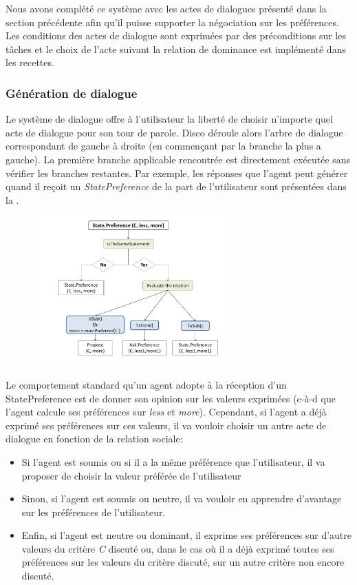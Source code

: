 \documentclass [french]{sig-alternate-05-2015}
\begin{document}
Nous avons complété ce système avec les actes de dialogues présenté dans la section précédente afin qu'il puisse supporter la négociation sur les préférences. Les conditions des actes de dialogue sont exprimées par des préconditions sur les tâches et le choix de l'acte suivant la relation de dominance est implémenté dans les recettes.

\subsubsection{Génération de dialogue} 
 \par Le système de dialogue offre à l'utilisateur la liberté de choisir n'importe quel acte de dialogue pour son tour de parole. Disco déroule alors l'arbre de dialogue correspondant de gauche à droite (en commençant par la branche la plus a gauche). La première branche applicable rencontrée est directement exécutée sans vérifier les branches restantes.
 Par exemple, les réponses que l'agent peut générer quand il reçoit un \emph{StatePreference} de la part de l'utilisateur sont présentées dans la .

 \begin{figure} [h]
 	\centerline{\includegraphics[width=3in]{figs/statePref.pdf}}
	\vskip 8pt
 \end{figure}

Le comportement standard qu'un agent adopte à la réception d'un StatePreference est de donner son opinion sur les valeurs exprimées (c-à-d que l'agent calcule ses préférences sur \textit{less} et \textit{more}). Cependant, si l'agent a déjà exprimé ses préférences sur ces valeurs, il va vouloir choisir un autre acte de dialogue en fonction de la relation sociale:
 \begin{itemize}
 	\item Si l'agent est soumis ou si il a la même préférence que l'utilisateur, il va proposer de choisir la valeur préférée de l'utilisateur
 	\item Sinon, si l'agent est soumis ou neutre, il va vouloir en apprendre d'avantage sur  les préférences de l'utilisateur.
 	\item Enfin, si l'agent est neutre ou dominant, il exprime ses préférences sur d'autre valeurs du critère \emph{C} discuté ou, dans le cas où il a déjà exprimé toutes ses préférences sur les valeurs du critère discuté, sur un autre critère non encore discuté.
 \end{itemize}
 
\end{document}
